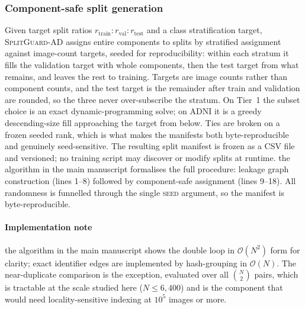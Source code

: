 \documentclass[11pt]{article}
\newcommand{\SGA}{\textsc{SplitGuard-AD}}
\begin{document}
\subsubsection{Component-safe split generation}
Given target split ratios $r_\text{train} : r_\text{val} : r_\text{test}$
and a class stratification target, \SGA{} assigns entire components to
splits by stratified assignment against image-count targets, seeded for
reproducibility: within each stratum it fills the validation target with
whole components, then the test target from what remains, and leaves the
rest to training. Targets are image counts rather than component counts,
and the test target is the remainder after train and validation are
rounded, so the three never over-subscribe the stratum. On Tier~1 the
subset choice is an exact dynamic-programming solve; on ADNI it is a
greedy descending-size fill approaching the target from below. Ties are
broken on a frozen seeded rank, which is what makes the manifests both
byte-reproducible and genuinely seed-sensitive.
The resulting split manifest is frozen as a CSV file and versioned; no
training script may discover or modify splits at runtime.
the algorithm in the main manuscript formalises the full procedure: leakage
graph construction (lines 1--8) followed by component-safe assignment
(lines 9--18). All randomness is funnelled through the single
\textsc{seed} argument, so the manifest is byte-reproducible.



\paragraph{Implementation note}
the algorithm in the main manuscript shows the double loop in $\mathcal{O}(N^2)$ form
for clarity; exact identifier edges are implemented by hash-grouping in
$\mathcal{O}(N)$. The near-duplicate comparison is the exception, evaluated
over all $\binom{N}{2}$ pairs, which is tractable at the scale studied here
($N \leq 6{,}400$) and is the component that would need locality-sensitive
indexing at $10^5$ images or more.
\end{document}
